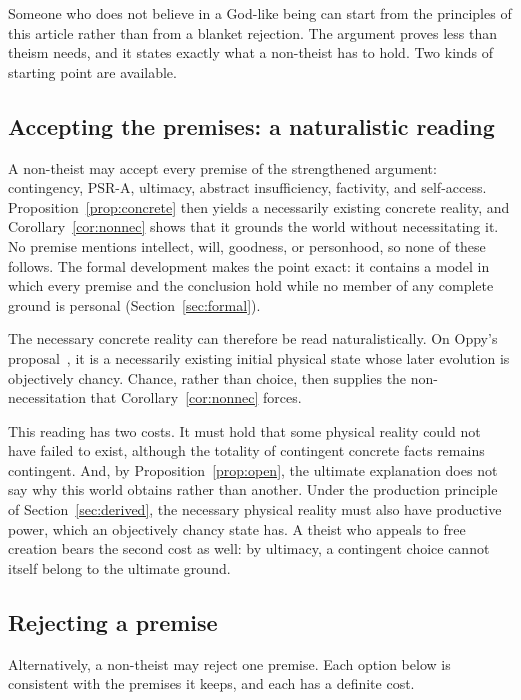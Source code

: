 \documentclass[11pt,letterpaper]{article}
\theoremstyle{plain}
\theoremstyle{definition}
\begin{document}
Someone who does not believe in a God-like being can start from the principles of this article rather than from a blanket rejection. The argument proves less than theism needs, and it states exactly what a non-theist has to hold. Two kinds of starting point are available.

\subsection{Accepting the premises: a naturalistic reading}

A non-theist may accept every premise of the strengthened argument: contingency, PSR-A, ultimacy, abstract insufficiency, factivity, and self-access. Proposition~\ref{prop:concrete} then yields a necessarily existing concrete reality, and Corollary~\ref{cor:nonnec} shows that it grounds the world without necessitating it. No premise mentions intellect, will, goodness, or personhood, so none of these follows. The formal development makes the point exact: it contains a model in which every premise and the conclusion hold while no member of any complete ground is personal (Section~\ref{sec:formal}).

The necessary concrete reality can therefore be read naturalistically. On Oppy's proposal~\cite{oppy13}, it is a necessarily existing initial physical state whose later evolution is objectively chancy. Chance, rather than choice, then supplies the non-necessitation that Corollary~\ref{cor:nonnec} forces.

This reading has two costs. It must hold that some physical reality could not have failed to exist, although the totality of contingent concrete facts remains contingent. And, by Proposition~\ref{prop:open}, the ultimate explanation does not say why this world obtains rather than another. Under the production principle of Section~\ref{sec:derived}, the necessary physical reality must also have productive power, which an objectively chancy state has. A theist who appeals to free creation bears the second cost as well: by ultimacy, a contingent choice cannot itself belong to the ultimate ground.

\subsection{Rejecting a premise}

Alternatively, a non-theist may reject one premise. Each option below is consistent with the premises it keeps, and each has a definite cost.
\end{document}
